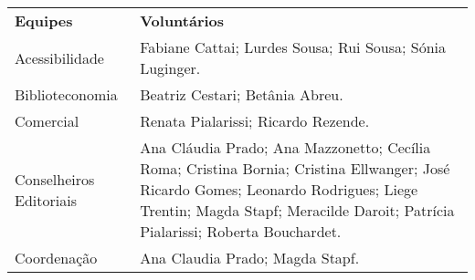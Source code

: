 \documentclass[
]{article}
\begin{document}
\begin{longtable}[]{@{}
  >{\raggedright\arraybackslash}p{}
  >{\raggedright\arraybackslash}p{}@{}}
\toprule\noalign{}
\begin{minipage}[b]{\linewidth}\centering
\textbf{Equipes}
\end{minipage} & \begin{minipage}[b]{\linewidth}\centering
\textbf{Voluntários}
\end{minipage} \\
\begin{minipage}[b]{\linewidth}\raggedright
Acessibilidade
\end{minipage} & \begin{minipage}[b]{\linewidth}\raggedright
Fabiane Cattai; Lurdes Sousa; Rui Sousa; Sónia Luginger.
\end{minipage} \\
\begin{minipage}[b]{\linewidth}\raggedright
Biblioteconomia
\end{minipage} & \begin{minipage}[b]{\linewidth}\raggedright
Beatriz Cestari; Betânia Abreu.
\end{minipage} \\
\begin{minipage}[b]{\linewidth}\raggedright
Comercial
\end{minipage} & \begin{minipage}[b]{\linewidth}\raggedright
Renata Pialarissi; Ricardo Rezende.
\end{minipage} \\
\begin{minipage}[b]{\linewidth}\raggedright
Conselheiros Editoriais
\end{minipage} & \begin{minipage}[b]{\linewidth}\raggedright
Ana Cláudia Prado; Ana Mazzonetto; Cecília Roma; Cristina Bornia; Cristina Ellwanger; José Ricardo Gomes; Leonardo Rodrigues; Liege Trentin; Magda Stapf; Meracilde Daroit; Patrícia Pialarissi; Roberta Bouchardet.
\end{minipage} \\
\begin{minipage}[b]{\linewidth}\raggedright
Coordenação
\end{minipage} & \begin{minipage}[b]{\linewidth}\raggedright
Ana Claudia Prado; Magda Stapf.
\end{minipage} \\

\end{longtable}
\end{document}

